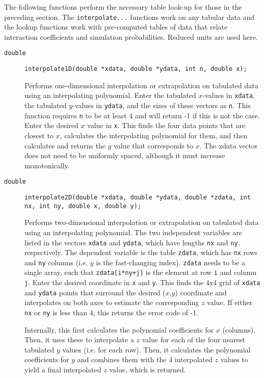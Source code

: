 \documentclass[11pt]{article}
\newcommand {\ttt} {\texttt}
\begin{document}
The following functions perform the necessary table look-up for those in the preceding section. The \ttt{interpolate...} functions work on any tabular data and the lookup functions work with pre-computed tables of data that relate interaction coefficients and simulation probabilities. Reduced units are used here.

\begin{description}

\item[\ttt{double}]
\ttt{interpolate1D(double *xdata, double *ydata, int n, double x);}

Performs one-dimensional interpolation or extrapolation on tabulated data using an interpolating polynomial. Enter the tabulated $x$-values in \ttt{xdata}, the tabulated $y$-values in \ttt{ydata}, and the sizes of these vectors as \ttt{n}. This function requires \ttt{n} to be at least 4 and will return -1 if this is not the case. Enter the desired $x$ value in \ttt{x}. This finds the four data points that are closest to $x$, calculates the interpolating polynomial for them, and then calculates and returns the $y$ value that corresponds to $x$. The xdata vector does not need to be uniformly spaced, although it must increase monotonically.

\item[\ttt{double}]
\ttt{interpolate2D(double *xdata, double *ydata, double *zdata, int nx, int ny, double x, double y);}

Performs two-dimensional interpolation or extrapolation on tabulated data using an interpolating polynomial. The two independent variables are listed in the vectors \ttt{xdata} and \ttt{ydata}, which have lengths \ttt{nx} and \ttt{ny}, respectively. The dependent variable is the table \ttt{zdata}, which has \ttt{nx} rows and \ttt{ny} columns (i.e. $y$ is the fast-changing index). \ttt{zdata} needs to be a single array, such that \ttt{zdata[i*ny+j]} is the element at row \ttt{i} and column \ttt{j}. Enter the desired coordinate in \ttt{x} and \ttt{y}. This finds the 4x4 grid of \ttt{xdata} and \ttt{ydata} points that surround the desired ($x$,$y$) coordinate and interpolates on both axes to estimate the corresponding $z$ value. If either \ttt{nx} or \ttt{ny} is less than 4, this returns the error code of -1.

Internally, this first calculates the polynomial coefficients for $x$ (columns). Then, it uses these to interpolate a $z$ value for each of the four nearest tabulated $y$ values (i.e. for each row). Then, it calculates the polynomial coefficients for $y$ and combines them with the 4 interpolated $z$ values to yield a final interpolated $z$ value, which is returned.



\end{description}
\end{document}
